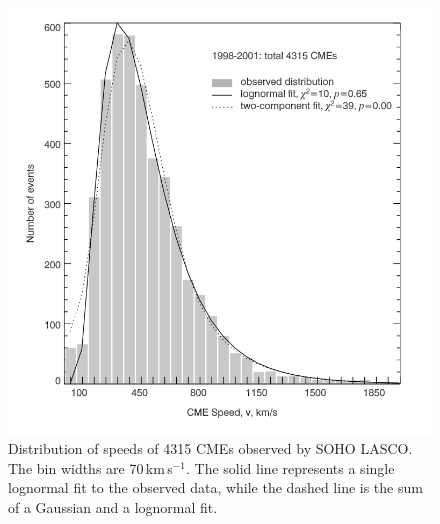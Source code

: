 \begin{figure}[!t]
\begin{center}
\includegraphics[scale=0.4]{images/cme_speed_histo}
\caption{Distribution of speeds of 4315 CMEs observed by SOHO LASCO. The bin widths are 70\,km\,s$^{-1}$. The solid line represents a single lognormal fit to the observed data, while the dashed line is the sum of a Gaussian and a lognormal fit. \citep{yurch2005} }
\end{center}
\label{fig:zhang2001}
\end{figure}

